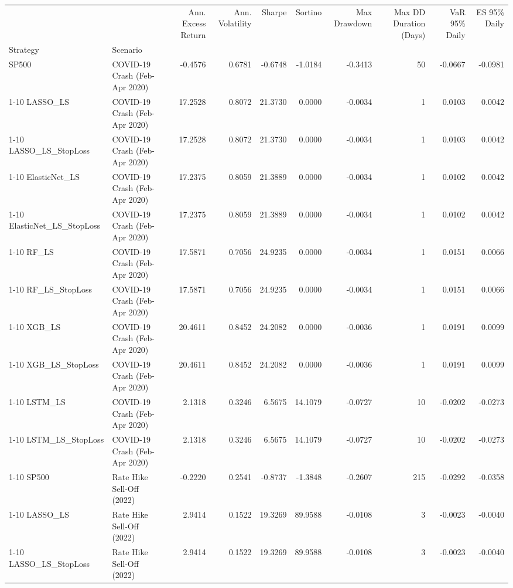 \begin{tabular}{llrrrrrrrr}
\toprule
 &  & Ann. Excess Return & Ann. Volatility & Sharpe & Sortino & Max Drawdown & Max DD Duration (Days) & VaR 95\% Daily & ES 95\% Daily \\
Strategy & Scenario &  &  &  &  &  &  &  &  \\
\midrule
SP500 & COVID-19 Crash (Feb-Apr 2020) & -0.4576 & 0.6781 & -0.6748 & -1.0184 & -0.3413 & 50 & -0.0667 & -0.0981 \\
\cline{1-10}
LASSO\_LS & COVID-19 Crash (Feb-Apr 2020) & 17.2528 & 0.8072 & 21.3730 & 0.0000 & -0.0034 & 1 & 0.0103 & 0.0042 \\
\cline{1-10}
LASSO\_LS\_StopLoss & COVID-19 Crash (Feb-Apr 2020) & 17.2528 & 0.8072 & 21.3730 & 0.0000 & -0.0034 & 1 & 0.0103 & 0.0042 \\
\cline{1-10}
ElasticNet\_LS & COVID-19 Crash (Feb-Apr 2020) & 17.2375 & 0.8059 & 21.3889 & 0.0000 & -0.0034 & 1 & 0.0102 & 0.0042 \\
\cline{1-10}
ElasticNet\_LS\_StopLoss & COVID-19 Crash (Feb-Apr 2020) & 17.2375 & 0.8059 & 21.3889 & 0.0000 & -0.0034 & 1 & 0.0102 & 0.0042 \\
\cline{1-10}
RF\_LS & COVID-19 Crash (Feb-Apr 2020) & 17.5871 & 0.7056 & 24.9235 & 0.0000 & -0.0034 & 1 & 0.0151 & 0.0066 \\
\cline{1-10}
RF\_LS\_StopLoss & COVID-19 Crash (Feb-Apr 2020) & 17.5871 & 0.7056 & 24.9235 & 0.0000 & -0.0034 & 1 & 0.0151 & 0.0066 \\
\cline{1-10}
XGB\_LS & COVID-19 Crash (Feb-Apr 2020) & 20.4611 & 0.8452 & 24.2082 & 0.0000 & -0.0036 & 1 & 0.0191 & 0.0099 \\
\cline{1-10}
XGB\_LS\_StopLoss & COVID-19 Crash (Feb-Apr 2020) & 20.4611 & 0.8452 & 24.2082 & 0.0000 & -0.0036 & 1 & 0.0191 & 0.0099 \\
\cline{1-10}
LSTM\_LS & COVID-19 Crash (Feb-Apr 2020) & 2.1318 & 0.3246 & 6.5675 & 14.1079 & -0.0727 & 10 & -0.0202 & -0.0273 \\
\cline{1-10}
LSTM\_LS\_StopLoss & COVID-19 Crash (Feb-Apr 2020) & 2.1318 & 0.3246 & 6.5675 & 14.1079 & -0.0727 & 10 & -0.0202 & -0.0273 \\
\cline{1-10}
SP500 & Rate Hike Sell-Off (2022) & -0.2220 & 0.2541 & -0.8737 & -1.3848 & -0.2607 & 215 & -0.0292 & -0.0358 \\
\cline{1-10}
LASSO\_LS & Rate Hike Sell-Off (2022) & 2.9414 & 0.1522 & 19.3269 & 89.9588 & -0.0108 & 3 & -0.0023 & -0.0040 \\
\cline{1-10}
LASSO\_LS\_StopLoss & Rate Hike Sell-Off (2022) & 2.9414 & 0.1522 & 19.3269 & 89.9588 & -0.0108 & 3 & -0.0023 & -0.0040 \\

\end{tabular}

